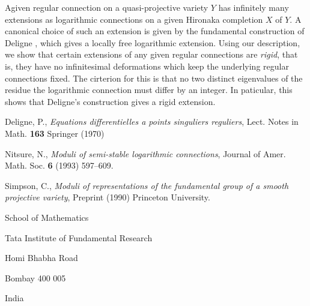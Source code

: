 A\pageoriginale given regular connection on a quasi-projective variety $Y$ has infinitely many extensions as logarithmic connections on a given Hironaka completion $X$ of $Y$. A canonical choice of such an extension is given by the fundamental construction of Deligne \cite{chap14-keyD}, which gives a locally free logarithmic extension. Using our description, we show that certain extensions of any given regular connections are \textit{rigid}, that is, they have no infinitesimal deformations which keep the underlying regular connections fixed. The cirterion for this is that no two distinct eigenvalues of the residue the logarithmic connection must differ by an integer. In paticular, this shows that Deligne's construction gives a rigid extension.

\begin{thebibliography}{99}
 Deligne, P., \textit{Equations differentielles a points singuliers reguliers}, Lect. Notes in Math. {\bf 163} Springer (1970)

 Nitsure, N., \textit{Moduli of semi-stable logarithmic connections}, Journal of Amer. Math. Soc.
 {\bf 6} (1993) 597--609.

 Simpson, C., \textit{Moduli of representations of the fundamental group of a smooth projective variety}, Preprint (1990) Princeton University.
\end{thebibliography}

\bigskip

\begin{flushleft}
School of Mathematics

Tata Institute of Fundamental Research

Homi Bhabha Road

Bombay 400 005

India
\end{flushleft}
